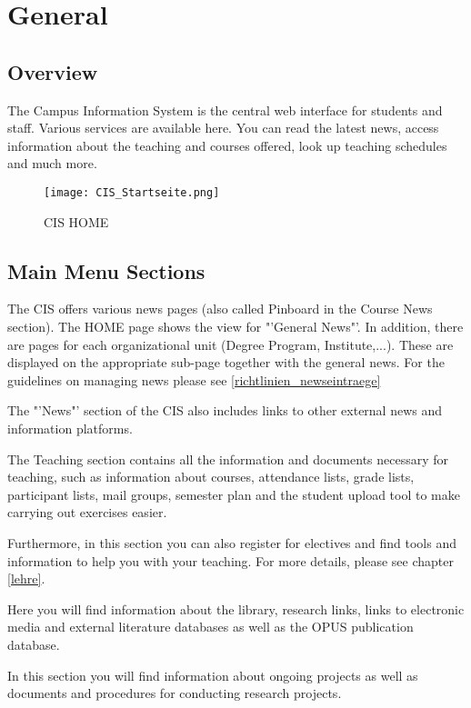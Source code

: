 \chapter{General}
\section{Overview}

The Campus Information System is the central web interface for students and staff. Various services are available here.
You can read the latest news, access information about the teaching and courses offered, look up teaching schedules and much more. 

\begin{figure}
	\centering
	\texttt{[image: CIS\_Startseite.png]}
	\caption{CIS HOME}
	\label{CIS_startseite}
\end{figure}

\section{Main Menu Sections}

The CIS offers various news pages (also called Pinboard in the Course News section). The HOME page shows the view for "'General News"'. In addition, there are pages for each organizational unit (Degree Program, Institute,...). These are displayed on the appropriate sub-page together with the general news.
For the guidelines on managing news please see \ref{richtlinien_newseintraege}

The "'News"' section of the CIS also includes links to other external news and information platforms.

The Teaching section contains all the information and documents necessary for teaching, such as information about courses, attendance lists, grade lists, participant lists, mail groups, semester plan and the student upload tool to make carrying out exercises easier.

Furthermore, in this section you can also register for electives and find tools and information to help you with your teaching.
For more details, please see chapter \ref{lehre}.

Here you will find information about the library, research links, links to electronic media and external literature databases as well as the OPUS publication database.

In this section you will find information about ongoing projects as well as documents and procedures for conducting research projects.

